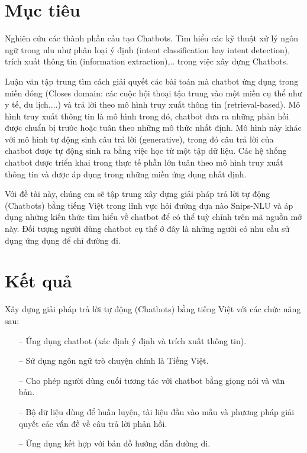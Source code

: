 \section{Mục tiêu}

Nghiên cứu các thành phần cấu tạo Chatbots. Tìm hiểu các kỹ thuật xử lý ngôn ngữ trong \ac{nlu} như phân loại ý định (intent classification hay intent detection), trích xuất thông tin (information extraction),.. trong việc xây dựng Chatbots.

Luận văn tập trung tìm cách giải quyết các bài toán mà chatbot ứng dụng trong miền đóng (Closes domain: các cuộc hội thoại tậo trung vào một miền cụ thể như y tế, du lịch,...) và trả lời theo mô hình truy xuất thông tin (retrieval-based). Mô hình truy xuất thông tin là mô hình trong đó, chatbot đưa ra những phản hồi được chuẩn bị trước hoặc tuân theo những mô thức nhất định. Mô hình này khác với mô hình tự động sinh câu trả lời (generative), trong đó câu trả lời của chatbot được tự động sinh ra bằng việc học từ một tập dữ liệu. Các hệ thống chatbot được triển khai trong thực tế phần lớn tuân theo mô hình truy xuất thông tin và được áp dụng trong những miền ứng dụng nhất định.

Với đề tài này, chúng em sẽ tập trung xây dựng giải pháp trả lời tự động (Chatbots) bằng tiếng Việt trong lĩnh vực hỏi đường dựa nào Snips-NLU và áp dụng những kiến thức tìm hiểu về chatbot để có thể tuỳ chỉnh trên mã nguồn mở này. Đối tượng người dùng chatbot cụ thể ở đây là những người có nhu cầu sử dụng ứng dụng để chỉ đường đi. 

\section{Kết quả}
Xây dựng giải pháp trả lời tự động (Chatbots) bằng tiếng Việt với các chức năng sau:
\begin{itemize}
    \item[--] Ứng dụng chatbot (xác định ý định và trích xuất thông tin).
    \item[--] Sử dụng ngôn ngữ trò chuyện chính là Tiếng Việt.
    \item[--] Cho phép người dùng cuối tương tác với chatbot bằng giọng nói và văn bản.
    \item[--] Bộ dữ liệu dùng để huấn luyện, tài liệu đầu vào mẫu và phương pháp giải quyết các vấn đề về câu trả lời phản hồi.
    \item[--] Ứng dụng kết hợp với bản đồ hướng dẫn đường đi.
\end{itemize}




